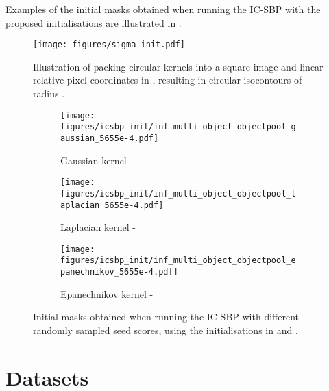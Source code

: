 \documentclass{article}
\begin{document}
Examples of the initial masks obtained when running the IC-SBP with the proposed initialisations are illustrated in .
\begin{figure}[h!]
    \begin{minipage}[b]{0.45\linewidth}
    	\centering
    	\texttt{[image: figures/sigma\_init.pdf]}
    	\vspace{25pt}
    	\caption{Illustration of packing  circular kernels into a square image and linear relative pixel coordinates in , resulting in circular isocontours of radius .}
    	\label{fig:gpp:sigma_init}
	\end{minipage}
    \quad
    \begin{minipage}[b]{0.45\linewidth}
    	\centering
    	\begin{subfigure}{\linewidth}
    		\texttt{[image: figures/icsbp\_init/inf\_multi\_object\_objectpool\_gaussian\_5655e-4.pdf]}
    		\caption{Gaussian kernel - }
    		\vspace{6pt}
    	\end{subfigure}
    	\begin{subfigure}{\linewidth}
    		\texttt{[image: figures/icsbp\_init/inf\_multi\_object\_objectpool\_laplacian\_5655e-4.pdf]}
    		\caption{Laplacian kernel - }
    		\vspace{6pt}
    	\end{subfigure}
    	\begin{subfigure}{\linewidth}
    		\texttt{[image: figures/icsbp\_init/inf\_multi\_object\_objectpool\_epanechnikov\_5655e-4.pdf]}
    		\caption{Epanechnikov kernel - }
    		\vspace{6pt}
    	\end{subfigure}
    	\caption{Initial masks obtained when running the IC-SBP with different randomly sampled seed scores, using the initialisations in  and .}
    	\label{fig:gpp:icsbp_init}
    	\vspace{1pt}
	\end{minipage}
\end{figure}


\clearpage

\section{Datasets}
\label{app:datasets}
\end{document}
